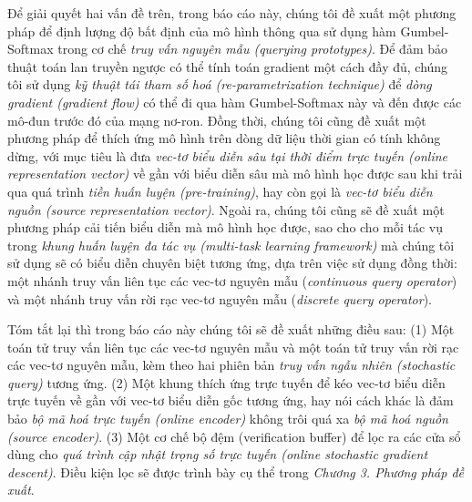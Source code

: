 Để giải quyết hai vấn đề trên, trong báo cáo này, chúng tôi đề xuất một phương pháp để định lượng độ bất định của mô hình thông qua sử dụng hàm Gumbel-Softmax \cite{jang2017categorical} trong cơ chế \textit{truy vấn nguyên mẫu (querying prototypes)}. Để đảm bảo thuật toán lan truyền ngược có thể tính toán gradient một cách đầy đủ, chúng tôi sử dụng \textit{kỹ thuật tái tham số hoá (re-parametrization technique)} để \textit{dòng gradient (gradient flow)} có thể đi qua hàm Gumbel-Softmax này và đến được các mô-đun trước đó của mạng nơ-ron.
Đồng thời, chúng tôi cũng đề xuất một phương pháp để thích ứng mô hình trên dòng dữ liệu thời gian có tính không dừng, với mục tiêu là đưa \textit{vec-tơ biểu diễn sâu tại thời điểm trực tuyến (online representation vector)} về gần với biểu diễn sâu mà mô hình học được sau khi trải qua quá trình \textit{tiền huấn luyện (pre-training)}, hay còn gọi là \textit{vec-tơ biểu diễn nguồn (source representation vector)}.
Ngoài ra, chúng tôi cũng sẽ đề xuất một phương pháp cải tiến biểu diễn mà mô hình học được, sao cho cho mỗi tác vụ trong \textit{khung huấn luyện đa tác vụ (multi-task learning framework)} mà chúng tôi sử dụng sẽ có biểu diễn chuyên biệt tương ứng, dựa trên việc sử dụng đồng thời: một nhánh truy vấn liên tục các vec-tơ nguyên mẫu (\textit{continuous query operator}) và một nhánh truy vấn rời rạc vec-tơ nguyên mẫu (\textit{discrete query operator}).

Tóm tắt lại thì trong báo cáo này chúng tôi sẽ đề xuất những điều sau: \newline
(1) Một toán tử truy vấn liên tục các vec-tơ nguyên mẫu và một toán tử truy vấn rời rạc các vec-tơ nguyên mẫu, kèm theo hai phiên bản \textit{truy vấn ngẫu nhiên (stochastic query)} tương ứng. \newline
(2) Một khung thích ứng trực tuyến để kéo vec-tơ biểu diễn trực tuyến về gần với vec-tơ biểu diễn gốc tương ứng, hay nói cách khác là đảm bảo \textit{bộ mã hoá trực tuyến (online encoder)} không trôi quá xa \textit{bộ mã hoá nguồn (source encoder)}. \newline
(3) Một cơ chế bộ đệm (verification buffer) để lọc ra các cửa sổ dùng cho \textit{quá trình cập nhật trọng số trực tuyến (online stochastic gradient descent)}. Điều kiện lọc sẽ được trình bày cụ thể trong \textit{Chương 3. Phương pháp đề xuất}.